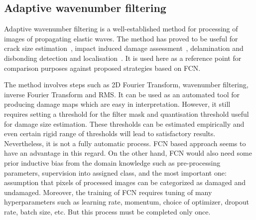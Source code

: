 
\subsection{Adaptive wavenumber filtering}
Adaptive wavenumber filtering is a well-established method for processing of images of propagating elastic waves.
The method has proved to be useful for crack size estimation~\cite{Kudela2015}, impact induced damage assessment~\cite{Kudela2018},  delamination and disbonding detection and localisation~\cite{Radzienski2019a}.  
It is used here as a reference point for comparison purposes against proposed strategies based on FCN.

The method involves steps such as 2D Fourier Transform, wavenumber filtering, inverse Fourier Transform and RMS.
It can be used as an automated tool for producing damage maps which are easy in interpretation.
However, it still requires setting a threshold for the filter mask and quantisation threshold useful for damage size estimation.
These thresholds can be estimated empirically and even certain rigid range of thresholds will lead to satisfactory results.
Nevertheless, it is not a fully automatic process.
FCN based approach seems to have an advantage in this regard.
On the other hand, FCN would also need some prior inductive bias from the domain knowledge such as pre-processing parameters, supervision into assigned class, and the most important one: assumption that pixels of processed images can be categorized as damaged and undamaged.
Moreover, the training of FCN requires tuning of many hyperparameters such as  learning rate, momentum, choice of optimizer, dropout rate, batch size, etc. 
But this process must be completed only once.